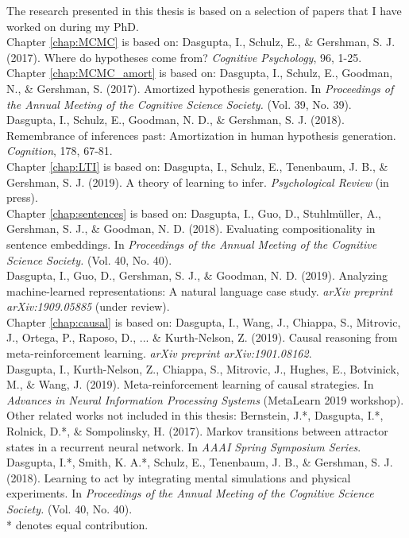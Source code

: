 
{\setlength{\parindent}{0em}
The research presented in this thesis is based on a selection of papers that I have worked on during my PhD.\\

Chapter \ref{chap:MCMC} is based on: Dasgupta, I., Schulz, E., \& Gershman, S. J. (2017). Where do hypotheses come from? \textit{Cognitive Psychology}, 96, 1-25.\\


Chapter \ref{chap:MCMC_amort} is based on:  Dasgupta, I., Schulz, E., Goodman, N., \& Gershman, S. (2017). Amortized hypothesis generation.  In \textit{Proceedings of the Annual Meeting of the Cognitive Science Society.} (Vol. 39, No. 39).\\ Dasgupta, I., Schulz, E., Goodman, N. D., \& Gershman, S. J. (2018). Remembrance of inferences past: Amortization in human hypothesis generation. \textit{Cognition}, 178, 67-81.\\


Chapter \ref{chap:LTI} is based on: Dasgupta, I., Schulz, E., Tenenbaum, J. B., \& Gershman, S. J. (2019). A theory of learning to infer.  \textit{Psychological Review} (in press).\\


Chapter \ref{chap:sentences} is based on: Dasgupta, I., Guo, D., Stuhlmüller, A., Gershman, S. J., \& Goodman, N. D. (2018). Evaluating compositionality in sentence embeddings. In \textit{Proceedings of the Annual Meeting of the Cognitive Science Society.} (Vol. 40, No. 40). \\ Dasgupta, I., Guo, D., Gershman, S. J., \& Goodman, N. D. (2019). Analyzing machine-learned representations: A natural language case study. \textit{arXiv preprint arXiv:1909.05885} (under review).\\


Chapter \ref{chap:causal} is based on: Dasgupta, I., Wang, J., Chiappa, S., Mitrovic, J., Ortega, P., Raposo, D., ... \& Kurth-Nelson, Z. (2019). Causal reasoning from meta-reinforcement learning. \textit{arXiv preprint arXiv:1901.08162}. \\ Dasgupta, I., Kurth-Nelson, Z., Chiappa, S., Mitrovic, J., Hughes, E., Botvinick, M., \& Wang, J. (2019). Meta-reinforcement learning of causal strategies.  In \textit{Advances in Neural Information Processing Systems} (MetaLearn 2019 workshop).\\


Other related works not included in this thesis: Bernstein, J.*, Dasgupta, I.*, Rolnick, D.*, \& Sompolinsky, H. (2017). Markov transitions between attractor states in a recurrent neural network. In \textit{AAAI Spring Symposium Series}. \\ Dasgupta, I.*, Smith, K. A.*, Schulz, E., Tenenbaum, J. B., \& Gershman, S. J. (2018). Learning to act by integrating mental simulations and physical experiments.  In \textit{Proceedings of the Annual Meeting of the Cognitive Science Society.} (Vol. 40, No. 40).\\
* denotes equal contribution.
}